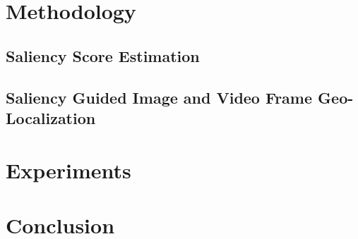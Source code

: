 \section{Methodology}
\subsection{Saliency Score Estimation}
\subsection{Saliency Guided Image and Video Frame Geo-Localization}

\section{Experiments}

\section{Conclusion}






